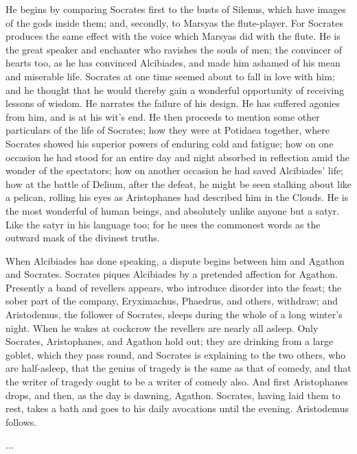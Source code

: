 \documentclass[11pt,letter]{article}
\begin{document}
\par  He begins by comparing Socrates first to the busts of Silenus, which have images of the gods inside them; and, secondly, to Marsyas the flute-player. For Socrates produces the same effect with the voice which Marsyas did with the flute. He is the great speaker and enchanter who ravishes the souls of men; the convincer of hearts too, as he has convinced Alcibiades, and made him ashamed of his mean and miserable life. Socrates at one time seemed about to fall in love with him; and he thought that he would thereby gain a wonderful opportunity of receiving lessons of wisdom. He narrates the failure of his design. He has suffered agonies from him, and is at his wit's end. He then proceeds to mention some other particulars of the life of Socrates; how they were at Potidaea together, where Socrates showed his superior powers of enduring cold and fatigue; how on one occasion he had stood for an entire day and night absorbed in reflection amid the wonder of the spectators; how on another occasion he had saved Alcibiades' life; how at the battle of Delium, after the defeat, he might be seen stalking about like a pelican, rolling his eyes as Aristophanes had described him in the Clouds. He is the most wonderful of human beings, and absolutely unlike anyone but a satyr. Like the satyr in his language too; for he uses the commonest words as the outward mask of the divinest truths.

\par  When Alcibiades has done speaking, a dispute begins between him and Agathon and Socrates. Socrates piques Alcibiades by a pretended affection for Agathon. Presently a band of revellers appears, who introduce disorder into the feast; the sober part of the company, Eryximachus, Phaedrus, and others, withdraw; and Aristodemus, the follower of Socrates, sleeps during the whole of a long winter's night. When he wakes at cockcrow the revellers are nearly all asleep. Only Socrates, Aristophanes, and Agathon hold out; they are drinking from a large goblet, which they pass round, and Socrates is explaining to the two others, who are half-asleep, that the genius of tragedy is the same as that of comedy, and that the writer of tragedy ought to be a writer of comedy also. And first Aristophanes drops, and then, as the day is dawning, Agathon. Socrates, having laid them to rest, takes a bath and goes to his daily avocations until the evening. Aristodemus follows.

\par  ...
\end{document}
